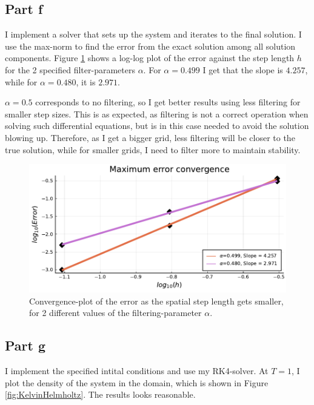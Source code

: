 \documentclass[aps, 12pt]{revtex4}
\begin{document}
\subsection*{Part f}
I implement a solver that sets up the system and iterates to the final solution. I use the max-norm to find the error from the exact solution among all solution components. Figure \ref{fig:convergence} shows a log-log plot of the error against the step length $h$ for the 2 specified filter-parameters $\alpha$. For $\alpha=0.499$ I get that the slope is $4.257$, while for $\alpha=0.480$, it is $2.971$.

$\alpha=0.5$ corresponds to no filtering, so I get better results using less filtering for smaller step sizes. This is as expected, as filtering is not a correct operation when solving such differential equations, but is in this case needed to avoid the solution blowing up. Therefore, as I get a bigger grid, less filtering will be closer to the true solution, while for smaller grids, I need to filter more to maintain stability.

\begin{figure}
    \includegraphics[width=\linewidth]{vortex_convergence.pdf}
    \caption{Convergence-plot of the error as the spatial step length gets smaller, for 2 different values of the filtering-parameter $\alpha$.}
    \label{fig:convergence}
\end{figure}

\subsection*{Part g}
I implement the specified intital conditions and use my RK4-solver. At $T=1$, I plot the density of the system in the domain, which is shown in Figure \ref{fig:KelvinHelmholtz}. The results looks reasonable.
\end{document}
